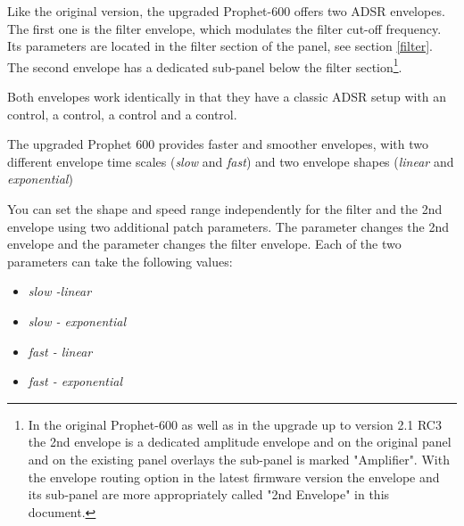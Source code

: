 Like the original version, the upgraded Prophet-600 offers two ADSR envelopes. The first one is the filter envelope, which modulates the filter cut-off frequency. Its parameters are located in the filter section of the panel, see section \ref{filter}. The second envelope has a dedicated sub-panel below the filter section\footnote{In the original Prophet-600 as well as in the upgrade up to version 2.1 RC3 the 2nd envelope is a dedicated amplitude envelope and on the original panel and on the existing panel overlays the sub-panel is marked "Amplifier". With the envelope routing option in the latest firmware version the envelope and its sub-panel are more appropriately called "2nd Envelope" in this document.}.

Both envelopes work identically in that they have a classic ADSR setup with an \attack control, a \decay control, a \sustain control and a \release control. 

\begin{center}
\end{center}

The upgraded Prophet 600 provides faster and smoother envelopes, with two different envelope time scales (\textit{slow} and \textit{fast}) and two envelope shapes (\textit{linear} and \textit{exponential})

You can set the shape and speed range independently for the filter and the 2nd envelope using two additional patch parameters. The parameter \secndenv changes the 2nd envelope and the parameter \filenv changes the filter envelope. Each of the two parameters can take the following values:

\begin{itemize}
  \setlength\itemsep{0cm}
  \item \textit{slow -linear}
  \item \textit{slow - exponential}
  \item \textit{fast - linear}
  \item \textit{fast - exponential}
\end{itemize}
 
